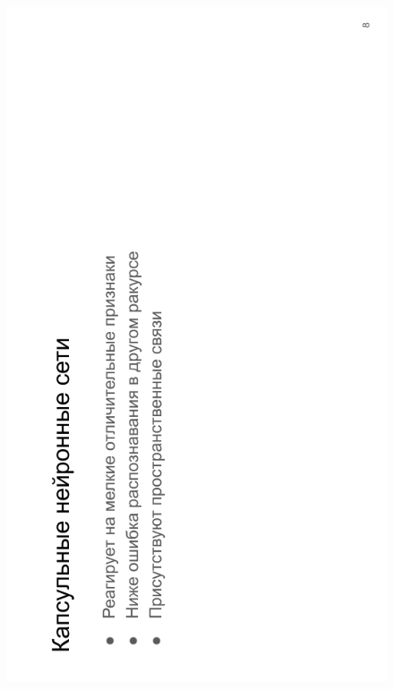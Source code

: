 \begin{figure}[H]
	\begin{center}
		\includegraphics[scale=0.7]{inc/img/slide8.png}
	\end{center}
\end{figure}